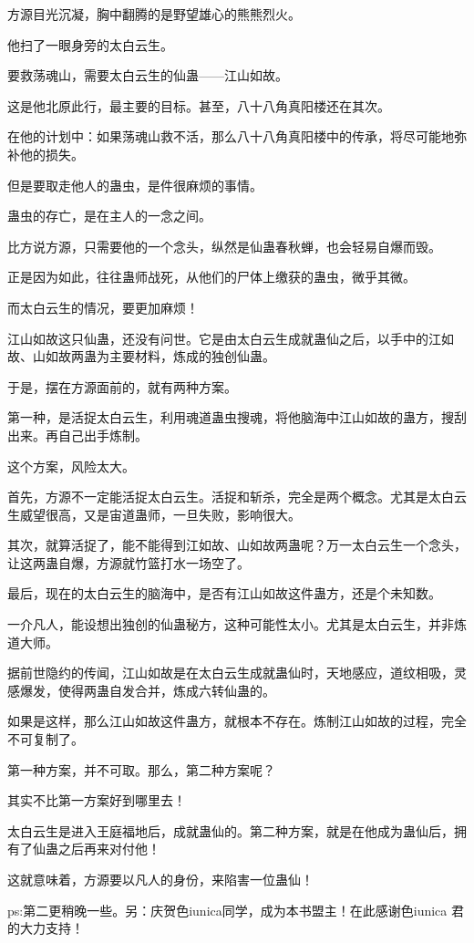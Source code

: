 \begin{this_body}
方源目光沉凝，胸中翻腾的是野望雄心的熊熊烈火。

他扫了一眼身旁的太白云生。

要救荡魂山，需要太白云生的仙蛊——江山如故。

这是他北原此行，最主要的目标。甚至，八十八角真阳楼还在其次。

在他的计划中：如果荡魂山救不活，那么八十八角真阳楼中的传承，将尽可能地弥补他的损失。

但是要取走他人的蛊虫，是件很麻烦的事情。

蛊虫的存亡，是在主人的一念之间。

比方说方源，只需要他的一个念头，纵然是仙蛊春秋蝉，也会轻易自爆而毁。

正是因为如此，往往蛊师战死，从他们的尸体上缴获的蛊虫，微乎其微。

而太白云生的情况，要更加麻烦！

江山如故这只仙蛊，还没有问世。它是由太白云生成就蛊仙之后，以手中的江如故、山如故两蛊为主要材料，炼成的独创仙蛊。

于是，摆在方源面前的，就有两种方案。

第一种，是活捉太白云生，利用魂道蛊虫搜魂，将他脑海中江山如故的蛊方，搜刮出来。再自己出手炼制。

这个方案，风险太大。

首先，方源不一定能活捉太白云生。活捉和斩杀，完全是两个概念。尤其是太白云生威望很高，又是宙道蛊师，一旦失败，影响很大。

其次，就算活捉了，能不能得到江如故、山如故两蛊呢？万一太白云生一个念头，让这两蛊自爆，方源就竹篮打水一场空了。

最后，现在的太白云生的脑海中，是否有江山如故这件蛊方，还是个未知数。

一介凡人，能设想出独创的仙蛊秘方，这种可能性太小。尤其是太白云生，并非炼道大师。

据前世隐约的传闻，江山如故是在太白云生成就蛊仙时，天地感应，道纹相吸，灵感爆发，使得两蛊自发合并，炼成六转仙蛊的。

如果是这样，那么江山如故这件蛊方，就根本不存在。炼制江山如故的过程，完全不可复制了。

第一种方案，并不可取。那么，第二种方案呢？

其实不比第一方案好到哪里去！

太白云生是进入王庭福地后，成就蛊仙的。第二种方案，就是在他成为蛊仙后，拥有了仙蛊之后再来对付他！

这就意味着，方源要以凡人的身份，来陷害一位蛊仙！

ps:第二更稍晚一些。另：庆贺色iunica同学，成为本书盟主！在此感谢色iunica 君的大力支持！

\end{this_body}

